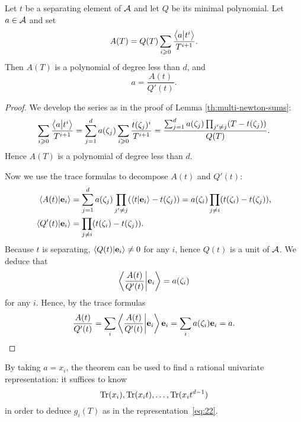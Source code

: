 \begin{theorem}
  \label{th:rur}
  Let $t$ be a separating element of $\mathcal{A}$ and let $Q$ be its
  minimal polynomial. Let $a\in\mathcal{A}$ and set
  \begin{equation}
    \label{eq:38}
    A(T) = Q(T)\sum_{i\geqslant0}\frac{\left\langle a \middle| t^i \right\rangle}{T^{i+1}}
    \text{.}
  \end{equation}
  Then $A(T)$ is a polynomial of degree less than $d$, and
  \begin{equation}
    \label{eq:39}
    a = \frac{A(t)}{Q'(t)}
    \text{.}
  \end{equation}
\end{theorem}
\begin{proof}
  We develop the series as in the proof of Lemma
  \ref{th:multi-newton-sums}:
  \begin{equation}
    \label{eq:40}
    \sum_{i\geqslant0}\frac{\left\langle a \middle| t^i \right\rangle}{T^{i+1}} =
    \sum_{j=1}^da(\zeta_j)\sum_{i\geqslant0}\frac{t(\zeta_j)^i}{T^{i+1}}=
    \frac{\sum_{j=1}^da(\zeta_j)\prod_{j'\ne j}(T-t(\zeta_j))}{Q(T)}
    \text{.}
  \end{equation}
  Hence $A(T)$ is a polynomial of degree less than $d$.

  Now we use the trace formulas to decompose 
  $A(t)$ and $Q'(t)$:
  \begin{align}
    \label{eq:41}
    \left\langle A(t) \middle| \mathbf{e}_i \right\rangle &=
    \sum_{j=1}^d a(\zeta_j)\prod_{j'\ne j}(\left\langle t \middle| \mathbf{e}_i \right\rangle-t(\zeta_j)) =
    a(\zeta_i)\prod_{j\ne i}(t(\zeta_i)-t(\zeta_j))
    \text{,}\\
    \left\langle Q'(t) \middle| \mathbf{e}_i \right\rangle &=
    \prod_{j\ne i}(t(\zeta_i)-t(\zeta_j))
    \text{.}
  \end{align}
  Because $t$ is separating, $\left\langle Q(t) \middle| \mathbf{e}_i \right\rangle\ne0$ for any
  $i$, hence $Q(t)$ is a unit of $\mathcal{A}$. We deduce that
  \begin{equation}
    \label{eq:42}
    \left\langle \frac{A(t)}{Q'(t)} \middle| \mathbf{e}_i \right\rangle = a(\zeta_i)
  \end{equation}
  for any $i$. Hence, by the trace formulas
  \begin{equation}
    \label{eq:43}
    \frac{A(t)}{Q'(t)} = \sum_i\left\langle \frac{A(t)}{Q'(t)} \middle| \mathbf{e}_i \right\rangle\mathbf{e}_i =
    \sum_i a(\zeta_i)\mathbf{e}_i = a
    \text{.}
  \end{equation}
\end{proof}

By taking $a=x_i$, the theorem can be used to find a rational
univariate representation: it suffices to know
\begin{equation}
  \label{eq:44}
  \operatorname{Tr}(x_i),\operatorname{Tr}(x_it),\ldots,\operatorname{Tr}(x_it^{d-1})
\end{equation}
in order to deduce $g_i(T)$ as in the representation~\eqref{eq:22}.

